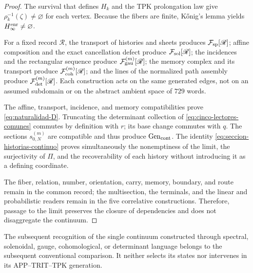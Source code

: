 \begin{proof}
The survival that defines \(H_k\) and the TPK prolongation law give
\(\rho_k^{-1}(\zeta)\neq\varnothing\) for each vertex. Because the fibers are
finite, Kőnig's lemma yields \(H_\infty^{\rm enr}\neq\varnothing\).

For a fixed record \(\mathscr R\), the transport of histories and sheets produces
\(\mathcal F_{\rm sp}[\mathscr R]\); affine composition and the exact
cancellation defect produce \(\mathcal F_{\rm sol}[\mathscr R]\); the incidences
and the rectangular sequence produce \(\mathcal F_{\rm gau}^{(m)}[\mathscr R]\);
the memory complex and its transport produce
\(\mathcal F_{\rm coh}^{(m)}[\mathscr R]\); and the lines of the normalized
path assembly produce \(\mathcal F_{\rm det}^{(m)}[\mathscr R]\).
Each construction acts on the same generated edges, not on an
assumed subdomain or on the abstract ambient space of \(729\) words.

The affine, transport, incidence, and memory compatibilities prove
\eqref{eq:naturalidad-D}. Truncating the determinant collection of
\eqref{eq:cinco-lectores-comunes} commutes by
definition with \(r\); its base change commutes with \(q\). The sections
\(s_{0,N}^{(m)}\) are compatible and thus produce
\(\operatorname{Gen}_{\rm cont}\). The identity
\eqref{eq:seccion-historias-continuo} proves simultaneously the
nonemptiness of the limit, the surjectivity of \(\Pi\), and the recoverability of each
history without introducing it as a defining coordinate.

The fiber, relation, number, orientation, carry, memory,
boundary, and route remain in the common record; the multisection, the
terminals, and the linear and probabilistic readers remain in the five
correlative constructions. Therefore, passage to the limit preserves the closure of
dependencies and does not disaggregate the continuum.
\end{proof}

The subsequent recognition of the single continuum constructed through
spectral, solenoidal, gauge, cohomological, or determinant language belongs to the
subsequent conventional comparison. It neither selects its states nor intervenes in
its APP--TRIT--TPK generation.

